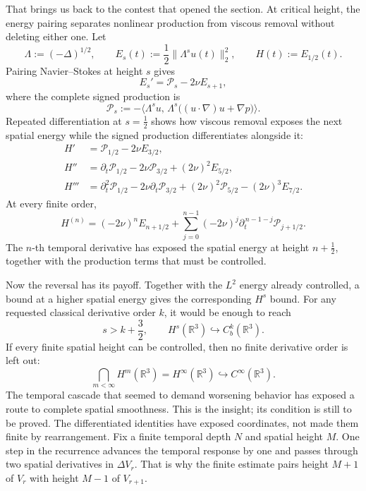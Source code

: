 That brings us back to the contest that opened the section.  At critical
height, the energy pairing separates nonlinear production from viscous removal
without deleting either one.  Let
\[
\Lambda:=(-\Delta)^{1/2},
\qquad
E_s(t):=\frac12\|\Lambda^su(t)\|_2^2,
\qquad
H(t):=E_{1/2}(t).
\]
Pairing Navier--Stokes at height \(s\) gives
\[
E_s'=\mathcal P_s-2\nu E_{s+1},
\]
where the complete signed production is
\[
\mathcal P_s
:=-\bigl\langle
\Lambda^su,\,
\Lambda^s\bigl((u\!\cdot\nabla)u+\nabla p\bigr)
\bigr\rangle.
\]
Repeated differentiation at \(s=\tfrac12\) shows how viscous removal exposes
the next spatial energy while the signed production differentiates alongside
it:
\[
\begin{aligned}
H'
&=\mathcal P_{1/2}-2\nu E_{3/2},\\
H''
&=\partial_t\mathcal P_{1/2}
  -2\nu\mathcal P_{3/2}
  +(2\nu)^2E_{5/2},\\
H'''
&=\partial_t^2\mathcal P_{1/2}
  -2\nu\partial_t\mathcal P_{3/2}
  +(2\nu)^2\mathcal P_{5/2}
  -(2\nu)^3E_{7/2}.
\end{aligned}
\]
At every finite order,
\[
H^{(n)}
=(-2\nu)^nE_{n+1/2}
+\sum_{j=0}^{n-1}(-2\nu)^j
 \partial_t^{\,n-1-j}\mathcal P_{j+1/2}.
\]
The \(n\)-th temporal derivative has exposed the spatial energy at height
\(n+\tfrac12\), together with the production terms that must be controlled.

Now the reversal has its payoff.  Together with the \(L^2\) energy already
controlled, a bound at a higher spatial energy gives the corresponding
\(H^s\) bound.  For any requested classical derivative order \(k\), it would
be enough to reach
\[
s>k+\frac32,
\qquad
H^s(\mathbb R^3)\hookrightarrow C_b^k(\mathbb R^3).
\]
If every finite spatial height can be controlled, then no finite derivative
order is left out:
\[
\bigcap_{m<\infty}H^m(\mathbb R^3)
=H^\infty(\mathbb R^3)
\hookrightarrow C^\infty(\mathbb R^3).
\]
The temporal cascade that seemed to demand worsening behavior has exposed a
route to complete spatial smoothness.  This is the insight; its condition is
still to be proved.  The differentiated identities have exposed coordinates,
not made them finite by rearrangement.  Fix a finite
temporal depth \(N\) and spatial height \(M\).  One step in the recurrence
advances the temporal response by one and passes through two spatial derivatives
in \(\Delta V_r\).  That is why the finite estimate pairs height \(M+1\)
of \(V_r\) with height \(M-1\) of \(V_{r+1}\).

